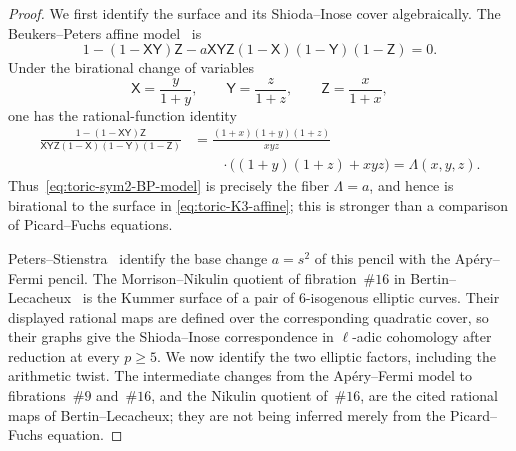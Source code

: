 \begin{proof}
We first identify the surface and its Shioda--Inose cover algebraically.  The
Beukers--Peters affine model~\cite{BeukersPeters1984} is
\begin{equation}
 1-(1-\mathsf X\mathsf Y)\mathsf Z
 -a\mathsf X\mathsf Y\mathsf Z
       (1-\mathsf X)(1-\mathsf Y)(1-\mathsf Z)=0.
 \label{eq:toric-sym2-BP-model}
\end{equation}
Under the birational change of variables
\begin{equation}
 \mathsf X=\frac{y}{1+y},\qquad
 \mathsf Y=\frac{z}{1+z},\qquad
 \mathsf Z=\frac{x}{1+x},
 \label{eq:toric-sym2-BP-change}
\end{equation}
one has the rational-function identity
\begin{equation}
 \begin{aligned}
 \frac{1-(1-\mathsf X\mathsf Y)\mathsf Z}
 {\mathsf X\mathsf Y\mathsf Z
  (1-\mathsf X)(1-\mathsf Y)(1-\mathsf Z)}
 &=\frac{(1+x)(1+y)(1+z)}{xyz}\\
 &\hspace{2em}\cdot\bigl((1+y)(1+z)+xyz\bigr)
 =\Lambda(x,y,z).
 \end{aligned}
 \label{eq:toric-sym2-BP-identity}
\end{equation}
Thus~\eqref{eq:toric-sym2-BP-model} is precisely the fiber
$\Lambda=a$, and hence is birational to the surface in
\eqref{eq:toric-K3-affine}; this is stronger than a comparison of
Picard--Fuchs equations.

Peters--Stienstra~\cite{PetersStienstra1989} identify the base change
$a=s^2$ of this pencil with the Ap\'ery--Fermi pencil.  The
Morrison--Nikulin quotient of fibration~$\#16$ in
Bertin--Lecacheux~\cite[Corollary~4.1]{BertinLecacheux2020} is the Kummer
surface of a pair of $6$-isogenous elliptic curves.  Their displayed rational
maps are defined over the corresponding quadratic cover, so their graphs give
the Shioda--Inose correspondence in $\ell$-adic cohomology after reduction at
every $p\geq5$.  We now identify the two elliptic factors, including the
arithmetic twist.  The intermediate changes from the Ap\'ery--Fermi model to
fibrations~$\#9$ and~$\#16$, and the Nikulin quotient of~$\#16$, are the cited
rational maps of Bertin--Lecacheux; they are not being inferred merely from
the Picard--Fuchs equation.


\end{proof}
